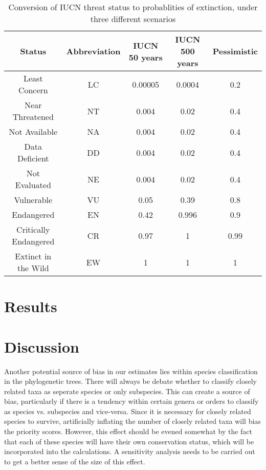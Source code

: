 \documentclass[10pt]{article}
\begin{document}
	\begin{table}[b]
		\begin{tabular}{|c|c c c c|}
			\hline
			Status & Abbreviation & IUCN 50 years & IUCN 500 years & Pessimistic \\
			\hline
			Least Concern & LC & 0.00005 & 0.0004 & 0.2 \\
			Near Threatened & NT & 0.004 & 0.02 & 0.4 \\
			Not Available & NA & 0.004 & 0.02 & 0.4 \\
			Data Deficient & DD & 0.004 & 0.02 & 0.4 \\
			Not Evaluated & NE & 0.004 & 0.02 & 0.4 \\
			Vulnerable & VU & 0.05 & 0.39 & 0.8 \\
			Endangered & EN & 0.42 & 0.996 & 0.9 \\
			Critically Endangered & CR & 0.97 & 1 & 0.99 \\
			Extinct in the Wild & EW & 1 & 1 & 1 \\
			\hline
		\end{tabular}
		\caption{Conversion of IUCN threat status to probablities of extinction, under three
			different scenarios \cite{mooersConvertingEndangeredSpecies2008}}
	\end{table}
	\section{Results}
	
	\section{Discussion}
	Another potential source of bias in our estimates lies within species
	classification in the phylogenetic trees. There will always be debate whether
	to classify closely related taxa as seperate species or only subspecies. This
	can create a source of bias, particularly if there is a tendency within certain
	genera or orders to classify as species vs. subspecies and vice-versa. Since it
	is necessary for closely related species to survive, artificially inflating the
	number of closely related taxa will bias the priority scores. However, this
	effect should be evened somewhat by the fact that each of these species will 
	have their own conservation status, which will be incorporated into the
	calculations. A sensitivity analysis needs to be carried out to get a better
	sense of the size of this effect.
	
	
	
\end{document}
